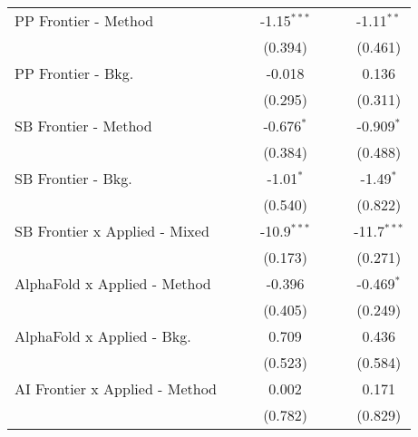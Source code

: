 \begin{tabular}{lcccccc}
   PP Frontier - Method           &               &             & -1.15$^{***}$ &               &              & -1.11$^{**}$\\   
                                  &               &             & (0.394)       &               &              & (0.461)\\   
   PP Frontier - Bkg.             &               &             & -0.018        &               &              & 0.136\\   
                                  &               &             & (0.295)       &               &              & (0.311)\\   
   SB Frontier - Method           &               &             & -0.676$^{*}$  &               &              & -0.909$^{*}$\\   
                                  &               &             & (0.384)       &               &              & (0.488)\\   
   SB Frontier - Bkg.             &               &             & -1.01$^{*}$   &               &              & -1.49$^{*}$\\   
                                  &               &             & (0.540)       &               &              & (0.822)\\   
   SB Frontier x Applied - Mixed  &               &             & -10.9$^{***}$ &               &              & -11.7$^{***}$\\   
                                  &               &             & (0.173)       &               &              & (0.271)\\   
   AlphaFold x Applied - Method   &               &             & -0.396        &               &              & -0.469$^{*}$\\   
                                  &               &             & (0.405)       &               &              & (0.249)\\   
   AlphaFold x Applied - Bkg.     &               &             & 0.709         &               &              & 0.436\\   
                                  &               &             & (0.523)       &               &              & (0.584)\\   
   AI Frontier x Applied - Method &               &             & 0.002         &               &              & 0.171\\   
                                  &               &             & (0.782)       &               &              & (0.829)\\   

\end{tabular}
